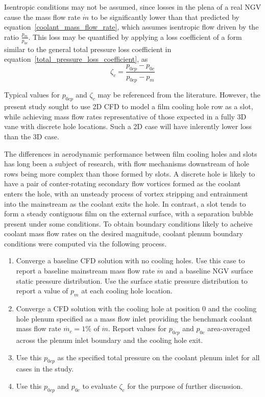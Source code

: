 \documentclass[a4paper, 11pt, oneside]{report}
\begin{document}
Isentropic conditions may not be assumed, since losses in the plena of a real NGV cause the mass flow rate $\dot{m}$ to be significantly lower than that predicted by equation~\ref{coolant_mass_flow_rate}, which assumes isentropic flow driven by the ratio $\frac{p_m}{p_{0c}}$. This loss may be quantified by applying a loss coefficient of a form similar to the general total pressure loss coefficient in equation~\ref{total_pressure_loss_coefficient}, as
\begin{equation}\label{film_coolant_loss_coefficient}
\zeta_c = 
\frac{
p_{0cp} - p_{0c}
}{
p_{0cp} - p_m
}
\end{equation}

\newpage
Typical values for $p_{0cp}$ and $\zeta_c$ may be referenced from the literature. However, the present study sought to use 2D CFD to model a film cooling hole row as a slot, while achieving mass flow rates representative of those expected in a fully 3D vane with discrete hole locations. Such a 2D case will have inlerently lower loss than the 3D case. 

The differences in aerodynamic performance between film cooling holes and slots has long been a subject of research, with flow mechanisms downstream of hole rows being more complex than those formed by slots. A discrete hole is likely to have a pair of conter-rotating secondary flow vortices formed as the coolant enters the hole, with an unsteady process of vortex stripping and entrainment into the mainstream as the coolant exits the hole. In contrast, a slot tends to form a steady contiguous film on the external surface, with a separation bubble present under some conditions. To obtain boundary conditions likely to acheive coolant mass flow rates on the desired magnitude, coolant plenum boundary conditions were computed via the following process.
\begin{enumerate}
  \item Converge a baseline CFD solution with no cooling holes. Use this case to report a baseline mainstream mass flow rate $\dot{m}$ and a baseline NGV surface static pressure distribution. Use the surface static pressure distribution to report a value of $p_m$ at each cooling hole location.
  \item Converge a CFD solution with the cooling hole at position $0$ and the cooling hole plenum specified as a mass flow inlet providing the benchmark coolant mass flow rate $\dot{m_c} = 1\%$ of $\dot{m}$. Report values for $p_{0cp}$ and $p_{0c}$ area-averaged across the plenum inlet boundary and the cooling hole exit.
  \item Use  this $p_{0cp}$ as the specified total pressure on the coolant plenum inlet for all cases in the study.
  \item Use this $p_{0cp}$ and $p_{0c}$ to evaluate $\zeta_c$ for the purpose of further discussion.
\end{enumerate}
\end{document}
